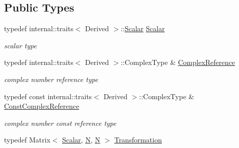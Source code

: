 \subsection*{Public Types}
\begin{DoxyCompactItemize}
\item 
typedef internal\+::traits$<$ Derived $>$\+::\hyperlink{class_sophus_1_1_s_o2_group_base_a075b701502715aecf0bdb3464963d36c}{Scalar} \hyperlink{class_sophus_1_1_s_o2_group_base_a075b701502715aecf0bdb3464963d36c}{Scalar}\hypertarget{class_sophus_1_1_s_o2_group_base_a075b701502715aecf0bdb3464963d36c}{}\label{class_sophus_1_1_s_o2_group_base_a075b701502715aecf0bdb3464963d36c}

\begin{DoxyCompactList}\small\item\em scalar type \end{DoxyCompactList}\item 
typedef internal\+::traits$<$ Derived $>$\+::Complex\+Type \& \hyperlink{class_sophus_1_1_s_o2_group_base_adad5730f4c0387415b8dfc3c5aa8b8f2}{Complex\+Reference}\hypertarget{class_sophus_1_1_s_o2_group_base_adad5730f4c0387415b8dfc3c5aa8b8f2}{}\label{class_sophus_1_1_s_o2_group_base_adad5730f4c0387415b8dfc3c5aa8b8f2}

\begin{DoxyCompactList}\small\item\em complex number reference type \end{DoxyCompactList}\item 
typedef const internal\+::traits$<$ Derived $>$\+::Complex\+Type \& \hyperlink{class_sophus_1_1_s_o2_group_base_a077856f95a5c02933efd03aa1393825f}{Const\+Complex\+Reference}\hypertarget{class_sophus_1_1_s_o2_group_base_a077856f95a5c02933efd03aa1393825f}{}\label{class_sophus_1_1_s_o2_group_base_a077856f95a5c02933efd03aa1393825f}

\begin{DoxyCompactList}\small\item\em complex number const reference type \end{DoxyCompactList}\item 
typedef Matrix$<$ \hyperlink{class_sophus_1_1_s_o2_group_base_a075b701502715aecf0bdb3464963d36c}{Scalar}, \hyperlink{class_sophus_1_1_s_o2_group_base_ab6b062ff165cf8f3c3d8deb09ff4cf0e}{N}, \hyperlink{class_sophus_1_1_s_o2_group_base_ab6b062ff165cf8f3c3d8deb09ff4cf0e}{N} $>$ \hyperlink{class_sophus_1_1_s_o2_group_base_a8981dccaf65802191e989815046b6a82}{Transformation}\hypertarget{class_sophus_1_1_s_o2_group_base_a8981dccaf65802191e989815046b6a82}{}\label{class_sophus_1_1_s_o2_group_base_a8981dccaf65802191e989815046b6a82}


\end{DoxyCompactItemize}
